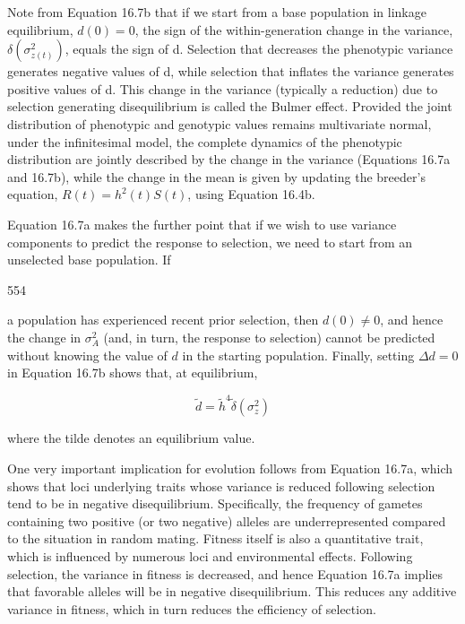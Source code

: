 \documentclass{article}
\begin{document}
Note from Equation 16.7b that if we start from a base population in linkage equilibrium,  $ d(0) = 0 $, the sign of the within-generation change in the variance,  $ \delta(\sigma_{z(t)}^{2}) $, equals the sign of d. Selection that decreases the phenotypic variance generates negative values of d, while selection that inflates the variance generates positive values of d. This change in the variance (typically a reduction) due to selection generating disequilibrium is called the Bulmer effect. Provided the joint distribution of phenotypic and genotypic values remains multivariate normal, under the infinitesimal model, the complete dynamics of the phenotypic distribution are jointly described by the change in the variance (Equations 16.7a and 16.7b), while the change in the mean is given by updating the breeder's equation,  $ R(t) = h^{2}(t) S(t) $, using Equation 16.4b.

Equation 16.7a makes the further point that if we wish to use variance components to predict the response to selection, we need to start from an unselected base population. If

554

a population has experienced recent prior selection, then  $ d(0) \neq 0 $, and hence the change in  $ \sigma_A^2 $ (and, in turn, the response to selection) cannot be predicted without knowing the value of  $ d $ in the starting population. Finally, setting  $ \Delta d = 0 $ in Equation 16.7b shows that, at equilibrium,

\begin{equation}
\widetilde{d}=\widetilde{h}^{4}\widetilde{\delta}(\sigma_{z}^{2})
\tag{16.7c}
\label{eq:16_7c}
\end{equation}

where the tilde denotes an equilibrium value.

One very important implication for evolution follows from Equation 16.7a, which shows that loci underlying traits whose variance is reduced following selection tend to be in negative disequilibrium. Specifically, the frequency of gametes containing two positive (or two negative) alleles are underrepresented compared to the situation in random mating. Fitness itself is also a quantitative trait, which is influenced by numerous loci and environmental effects. Following selection, the variance in fitness is decreased, and hence Equation 16.7a implies that favorable alleles will be in negative disequilibrium. This reduces any additive variance in fitness, which in turn reduces the efficiency of selection.
\end{document}
